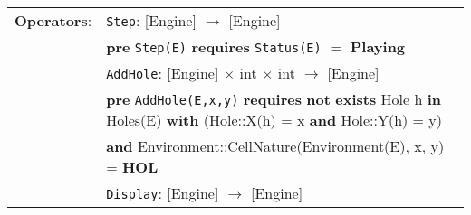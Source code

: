 \documentclass[7pt]{article}
\begin{document}
\begin{tabular}{rl}
\textbf{Operators}: & \texttt{Step}: \textrm{[Engine]} $\rightarrow$ \textrm{[Engine]}\\
& \quad\quad \textbf{pre} \texttt{Step(E)} \textbf{requires} \texttt{Status(E)} $=$ \textbf{Playing} \\
& \texttt{AddHole}: \textrm{[Engine]} $\times$ \textrm{int} $\times$ \textrm{int} $\rightarrow$ \textrm{[Engine]}\\
& \quad\quad \textbf{pre} \texttt{AddHole(E,x,y)} \textbf{requires} \textbf{not} \textbf{exists} Hole h \textbf{in} Holes(E) \textbf{with} (Hole::X(h) = x \textbf{and} Hole::Y(h) = y) \\ & \quad\quad\quad \textbf{and} Environment::CellNature(Environment(E), x, y) = \textbf{HOL}\\
& \texttt{Display}: \textrm{[Engine]} $\rightarrow$ \textrm{[Engine]}\\


\end{tabular}
\end{document}
